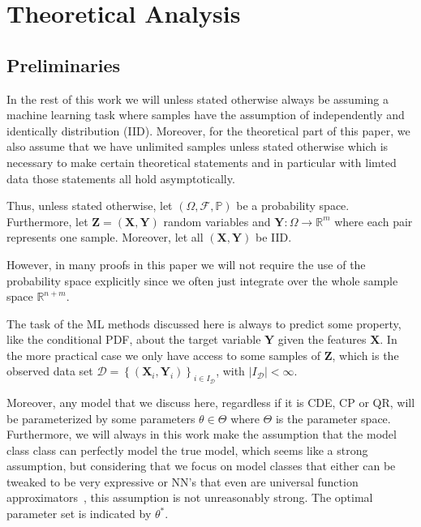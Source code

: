 \chapter{Theoretical Analysis}\label{chap:theoretical}

\section{Preliminaries}\label{sec:preliminaries}

In the rest of this work we will unless stated otherwise always be assuming a machine learning task where samples have the assumption of independently and identically distribution (IID). Moreover, for the theoretical part of this paper, we also assume that we have unlimited samples unless stated otherwise which is necessary to make certain theoretical statements and in particular with limted data those statements all hold asymptotically.

Thus, unless stated otherwise, let $\left(\Omega, \mathcal{F}, \mathbb{P}\right)$ be a probability space. Furthermore, let $\mathbf{Z} = (\mathbf{X}, \mathbf{Y})$ random variables and $\mathbf{Y}: \Omega \to \mathbb{R}^m$ where each pair represents one sample. Moreover, let all $(\mathbf{X}, \mathbf{Y})$ be IID.\@

However, in many proofs in this paper we will not require the use of the probability space explicitly since we often just integrate over the whole sample space $\mathbb{R}^{n+m}$.

The task of the ML methods discussed here is always to predict some property, like the conditional PDF, about the target variable $\mathbf{Y}$ given the features $\mathbf{X}$. In the more practical case we only have access to some samples of $\mathbf{Z}$, which is the observed data set $\mathcal{D} = \left\{\left(\mathbf{X}_i, \mathbf{Y}_i\right)\right\}_{i\in I_{\mathcal{D}}}$, with $|I_{\mathcal{D}}| < \infty$.

Moreover, any model that we discuss here, regardless if it is CDE, CP or QR, will be parameterized by some parameters $\theta \in \Theta$ where $\Theta$ is the parameter space. Furthermore, we will always in this work make the assumption that the model class class can perfectly model the true model, which seems like a strong assumption, but considering that we focus on model classes that either can be tweaked to be very expressive or NN's that even are universal function approximators~\cite{HORNIK1989359}, this assumption is not unreasonably strong. The optimal parameter set is indicated by $\theta^*$.

